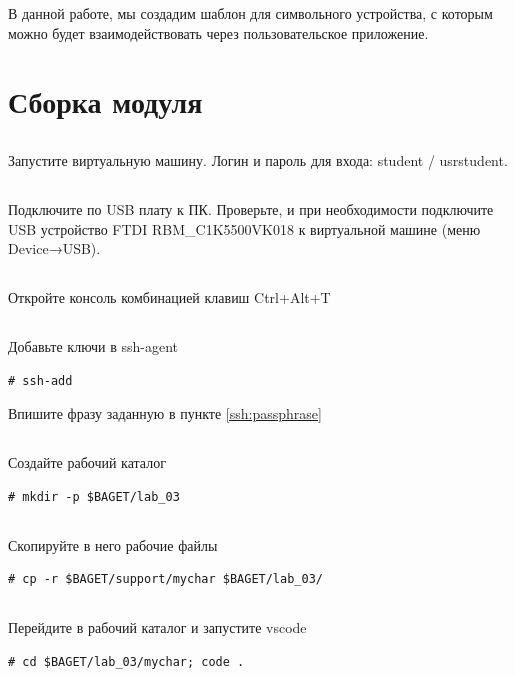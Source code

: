 В данной работе, мы создадим шаблон для символьного устройства, с которым можно будет взаимодействовать через пользовательское приложение.

\section{Сборка модуля}

\subsection{}Запустите виртуальную машину. Логин и пароль для входа: student / usrstudent.

\subsection{}Подключите по USB плату к ПК. Проверьте, и при необходимости подключите USB устройство FTDI RBM\_C1K5500VK018 к виртуальной машине (меню Device→USB).

\subsection{}Откройте консоль комбинацией клавиш Ctrl+Alt+T

\subsection{}Добавьте ключи в ssh-agent
\begin{lstlisting}[style=bash]
# ssh-add
\end{lstlisting}
Впишите фразу заданную в пункте \ref{ssh:passphrase}

\subsection{}Создайте рабочий каталог
\begin{lstlisting}[style=bash]
# mkdir -p $BAGET/lab_03 
\end{lstlisting}

\subsection{}Скопируйте в него рабочие файлы
\begin{lstlisting}[style=bash]
# cp -r $BAGET/support/mychar $BAGET/lab_03/
\end{lstlisting}

\subsection{}Перейдите в рабочий каталог и запустите vscode
\begin{lstlisting}[style=bash]
# cd $BAGET/lab_03/mychar; code .
\end{lstlisting}

